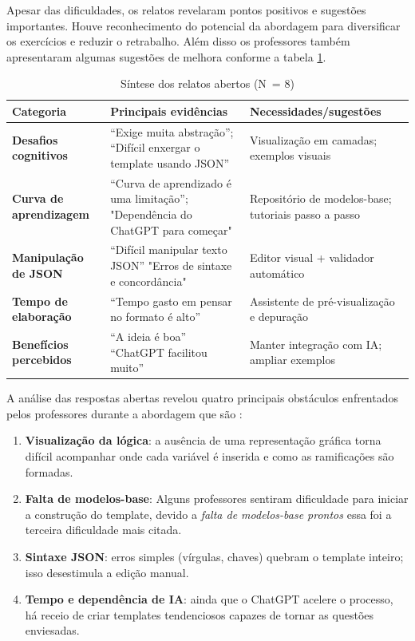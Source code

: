 Apesar das dificuldades, os relatos revelaram pontos positivos e sugestões importantes. Houve reconhecimento do potencial da abordagem para diversificar os exercícios e reduzir o retrabalho. Além disso os professores também apresentaram algumas sugestões de melhora conforme a tabela \ref{tab:relatos-abertos}.


\begin{table}[H]
\centering
\caption{Síntese dos relatos abertos (N~= 8)}
\label{tab:relatos-abertos}
\begin{tabular}{|p{} |p{} |p{}|}
\hline
\textbf{Categoria} & \textbf{Principais evidências} & \textbf{Necessidades/sugestões} \\ \hline
\textbf{Desafios cognitivos} & 
    “Exige muita abstração”; \newline
    “Difícil enxergar o template usando JSON”
& Visualização em camadas; exemplos visuais \\ \hline
\textbf{Curva de aprendizagem} & 
    “Curva de aprendizado é uma limitação”;\newline
     "Dependência do ChatGPT para começar"
 & Repositório de modelos-base; tutoriais passo a passo \\ \hline
\textbf{Manipulação de JSON} & 
    “Difícil manipular texto JSON” \newline
    "Erros de sintaxe e concordância"
 & Editor visual + validador automático \\ \hline
\textbf{Tempo de elaboração} & 
    “Tempo gasto em pensar no formato é alto” 
& Assistente de pré-visualização e depuração \\ \hline
\textbf{Benefícios percebidos} & 
    “A ideia é boa” \newline
    “ChatGPT facilitou muito”
 & Manter integração com IA; ampliar exemplos \\ \hline
\end{tabular}
\end{table}

A análise das respostas abertas revelou quatro principais obstáculos enfrentados pelos professores durante a abordagem que são : 

\begin{enumerate}
    \item \textbf{Visualização da lógica}: a ausência de uma representação gráfica torna difícil acompanhar onde cada variável é inserida e como as ramificações são formadas.
    \item \textbf{Falta de modelos-base}: Alguns professores sentiram dificuldade para iniciar a construção do template, devido a \emph{falta de modelos-base prontos} essa foi a terceira dificuldade mais citada.
    \item \textbf{Sintaxe JSON}: erros simples (vírgulas, chaves) quebram o template inteiro; isso desestimula a edição manual.
    \item \textbf{Tempo e dependência de IA}: ainda que o ChatGPT acelere o processo, há receio de criar templates tendenciosos capazes de tornar as questões enviesadas.
\end{enumerate}

